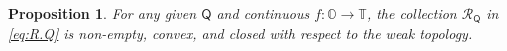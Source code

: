 \documentclass[a4paper, 12pt]{article}
\theoremstyle{plain}
\newtheorem{prop}{Proposition}
\theoremstyle{definition}
\theoremstyle{remark}
\newcommand{\OO}{\mathbb{O}}
\newcommand{\TT}{\mathbb{T}}
\newcommand{\prior}{\mathsf{Q}}
\newcommand{\credal}{\mathscr{Q}}
\newcommand{\pbcred}{\mathscr{R}}
\newcommand{\pb}{\mathsf{R}}
\begin{document}
\begin{prop}
\label{prop:pullback}
For any given $\prior$ and continuous $f: \OO \to \TT$, the collection $\pbcred_\prior$ in \eqref{eq:R.Q} is non-empty, convex, and closed with respect to the weak topology. 
\end{prop}

\end{document}
